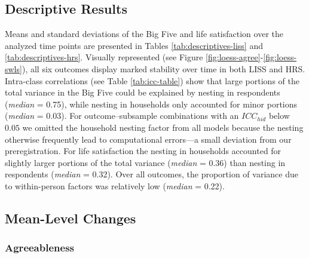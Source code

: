 \documentclass[
  english,
  man, noextraspace]{apa7}
\begin{document}
\hypertarget{descriptive-results}{%
\subsection{Descriptive Results}\label{descriptive-results}}

Means and standard deviations of the Big Five and life satisfaction over the analyzed time points are presented in Tables \ref{tab:descriptives-liss} and \ref{tab:descriptives-hrs}. Visually represented (see Figure \ref{fig:loess-agree}-\ref{fig:loess-swls}), all six outcomes display marked stability over time in both LISS and HRS. Intra-class correlations (see Table \ref{tab:icc-table}) show that large portions of the total variance in the Big Five could be explained by nesting in respondents (\emph{median} = 0.75), while nesting in households only accounted for minor portions (\emph{median} = 0.03). For outcome--subsample combinations with an \(ICC_{hid}\) below \(0.05\) we omitted the household nesting factor from all models because the nesting otherwise frequently lead to computational errors---a small deviation from our preregistration. For life satisfaction the nesting in households accounted for slightly larger portions of the total variance (\emph{median} = 0.36) than nesting in respondents (\emph{median} = 0.32). Over all outcomes, the proportion of variance due to within-person factors was relatively low (\emph{median} = 0.22).

\hypertarget{mean-level-changes}{%
\subsection{Mean-Level Changes}\label{mean-level-changes}}

\hypertarget{agreeableness}{%
\subsubsection{Agreeableness}\label{agreeableness}}
\end{document}
